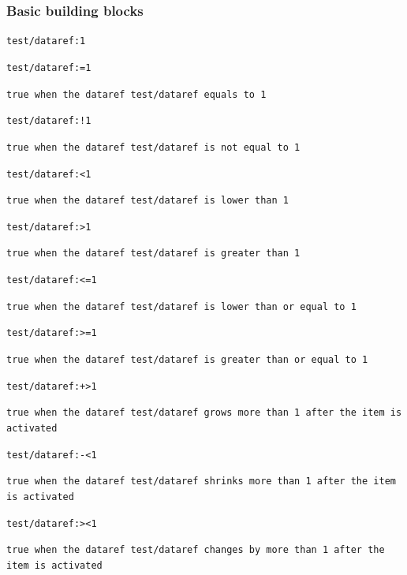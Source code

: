 \documentclass[11pt,parskip=half,a4paper]{scrartcl}
\newcommand\textstyleSourceText[1]{\texttt{#1}}
\begin{document}
\subsubsection{Basic building blocks}
\textstyleSourceText{test/dataref:1}

\textstyleSourceText{test/dataref:=1}

{\ttfamily
\textstyleSourceText{true when the dataref {\textquotedbl}test/dataref{\textquotedbl} equals to 1}}

\textstyleSourceText{test/dataref:!1}

{\ttfamily
\textstyleSourceText{true when the dataref {\textquotedbl}test/dataref{\textquotedbl} is not equal to 1}}

\textstyleSourceText{test/dataref:{\textless}1}

{\ttfamily
\textstyleSourceText{true when the dataref {\textquotedbl}test/dataref{\textquotedbl} is lower than 1}}

\textstyleSourceText{test/dataref:{\textgreater}1}

{\ttfamily
\textstyleSourceText{true when the dataref {\textquotedbl}test/dataref{\textquotedbl} is greater than 1}}

\textstyleSourceText{test/dataref:{\textless}=1}

{\ttfamily
\textstyleSourceText{true when the dataref {\textquotedbl}test/dataref{\textquotedbl} is lower than or equal to 1}}

\textstyleSourceText{test/dataref:{\textgreater}=1}

{\ttfamily
\textstyleSourceText{true when the dataref {\textquotedbl}test/dataref{\textquotedbl} is greater than or equal to 1}}

\textstyleSourceText{test/dataref:+{\textgreater}1}

{\ttfamily
\textstyleSourceText{true when the dataref {\textquotedbl}test/dataref{\textquotedbl} grows more than 1 after the item
is activated}}

\textstyleSourceText{test/dataref:-{\textless}1}

{\ttfamily
\textstyleSourceText{true when the dataref {\textquotedbl}test/dataref{\textquotedbl} shrinks more than 1 after the item is activated}}

\textstyleSourceText{test/dataref:{\textgreater}{\textless}1}

{\ttfamily
\textstyleSourceText{true when the dataref {\textquotedbl}test/dataref{\textquotedbl} changes by more than 1 after the item is activated}}
\end{document}
